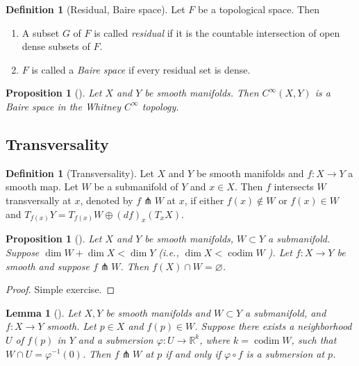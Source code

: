 \documentclass[reqno]{amsart}
\newtheorem{lemma}[theorem]{Lemma}
\newtheorem{proposition}[theorem]{Proposition}
\theoremstyle{definition}
\newtheorem{definition}[theorem]{Definition}
\theoremstyle{remark}
\DeclareMathOperator{\codim}{codim}
\begin{document}
\begin{definition}[Residual, Baire space]
    Let $F$ be a topological space.
    Then
    \begin{enumerate}
        \item A subset $G$ of $F$ is called
            \textit{residual} if it is the countable
            intersection of open dense subsets of $F$.
        \item $F$ is called a \textit{Baire space} if
            every residual set is dense.
    \end{enumerate}
\end{definition}

\begin{proposition}[]\label{Sm-Maps-Mfds-Baire}
    Let $X$ and $Y$ be smooth manifolds. Then
    $C^{\infty}(X,Y)$ is a Baire space in the
    Whitney $C^{\infty}$ topology.
\end{proposition}

\subsection{Transversality}

\begin{definition}[Transversality]
    Let $X$ and $Y$ be smooth manifolds and
    $f \colon X \to Y$ a smooth map. Let
    $W$ be a submanifold of $Y$ and
    $x \in X$. Then $f$ intersects $W$ transversally
    at $x$, denoted by
    $f \pitchfork W $ at $x$, if either
    $f(x) \not\in W$ or
    $f(x) \in W$ and
    $T_{f(x)}Y = T_{f(x)} W \oplus
    \left( df \right)_x \left( T_x X \right) $.
\end{definition}

\begin{proposition}[]\label{Transversality-Dimensions}
    Let $X$ and $Y$ be smooth manifolds,
    $W \subset Y$ a submanifold. 
    Suppose $\dim W + \dim X < \dim Y$ (i.e.,
    $\dim X < \codim W$ ). Let
    $f \colon X \to Y$ be smooth and suppose 
    $f \pitchfork W$. Then
    $f(X) \cap W = \varnothing$.
\end{proposition}

\begin{proof}
    Simple exercise.
\end{proof}

\begin{lemma}[]\label{Transversality-Submersion}
    Let $X,Y$ be smooth manifolds and
    $W \subset Y$ a submanifold, and
    $f \colon X \to Y$ smooth. Let
    $p \in X$ and $f(p) \in W$. Suppose there
    exists a neighborhood $U$ of $f(p)$ in
    $Y$ and a submersion $\varphi \colon
    U \to \mathbb{R}^{k}$, where
    $k = \codim W$, such that
    $W \cap U = \varphi^{-1}(0)$. Then
    $f \pitchfork W$ at $p$ if and only if
    $\varphi \circ f$ is a submersion at $p$.
\end{lemma}
\end{document}
